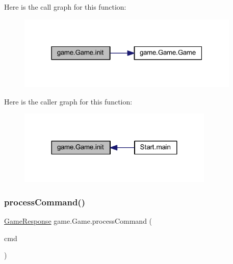 Here is the call graph for this function\+:
\nopagebreak
\begin{figure}[H]
\begin{center}
\leavevmode
\includegraphics[width=301pt]{classgame_1_1_game_ab06907ac42599c20175756897f58db82_cgraph}
\end{center}
\end{figure}
Here is the caller graph for this function\+:
\nopagebreak
\begin{figure}[H]
\begin{center}
\leavevmode
\includegraphics[width=264pt]{classgame_1_1_game_ab06907ac42599c20175756897f58db82_icgraph}
\end{center}
\end{figure}
\mbox{\label{classgame_1_1_game_a8016a543126f802488e94125daccce45}} 
\subsubsection{\texorpdfstring{process\+Command()}{processCommand()}}
{\footnotesize\ttfamily \mbox{\hyperlink{classui_1_1_game_response}{Game\+Response}} game.\+Game.\+process\+Command (\begin{DoxyParamCaption}\item[{\mbox{\hyperlink{classui_1_1_u_i_action}{U\+I\+Action}}}]{cmd }\end{DoxyParamCaption})\hspace{0.3cm}{\ttfamily [inline]}}

